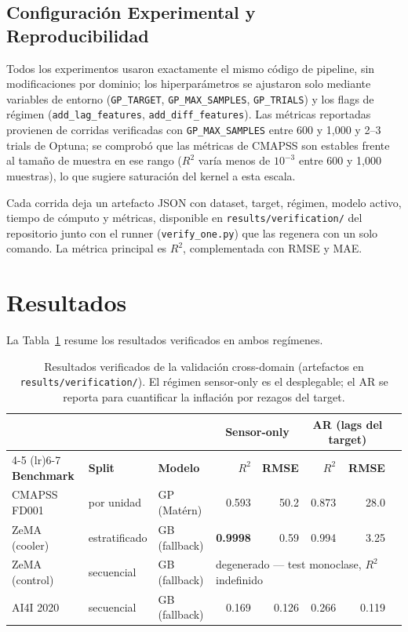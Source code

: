 \documentclass[10pt]{article}
\begin{document}
\subsection{Configuración Experimental y Reproducibilidad}

Todos los experimentos usaron exactamente el mismo código de pipeline, sin modificaciones por dominio; los hiperparámetros se ajustaron solo mediante variables de entorno (\texttt{GP\_TARGET}, \texttt{GP\_MAX\_SAMPLES}, \texttt{GP\_TRIALS}) y los flags de régimen (\texttt{add\_lag\_features}, \texttt{add\_diff\_features}). Las métricas reportadas provienen de corridas verificadas con \texttt{GP\_MAX\_SAMPLES} entre 600 y 1,000 y 2--3 trials de Optuna; se comprobó que las métricas de CMAPSS son estables frente al tamaño de muestra en ese rango ($R^2$ varía menos de $10^{-3}$ entre 600 y 1,000 muestras), lo que sugiere saturación del kernel a esta escala.

Cada corrida deja un artefacto JSON con dataset, target, régimen, modelo activo, tiempo de cómputo y métricas, disponible en \texttt{results/verification/} del repositorio junto con el runner (\texttt{verify\_one.py}) que las regenera con un solo comando. La métrica principal es $R^2$, complementada con RMSE y MAE.

\section{Resultados}

La Tabla~\ref{tab:results} resume los resultados verificados en ambos regímenes.

\begin{table}[H]
\centering
\caption{Resultados verificados de la validación cross-domain (artefactos en \texttt{results/verification/}). El régimen sensor-only es el desplegable; el AR se reporta para cuantificar la inflación por rezagos del target.}
\label{tab:results}
\begin{tabular}{lllrrrrr}
\toprule
& & & \multicolumn{2}{c}{\textbf{Sensor-only}} & \multicolumn{2}{c}{\textbf{AR (lags del target)}} \\
\cmidrule(lr){4-5} \cmidrule(lr){6-7}
\textbf{Benchmark} & \textbf{Split} & \textbf{Modelo} & $R^2$ & \textbf{RMSE} & $R^2$ & \textbf{RMSE} \\
\midrule
CMAPSS FD001 & por unidad & GP (Matérn) & 0.593 & 50.2 & 0.873 & 28.0 \\
ZeMA (cooler) & estratificado & GB (fallback) & \textbf{0.9998} & 0.59 & 0.994 & 3.25 \\
ZeMA (control) & secuencial & GB (fallback) & \multicolumn{4}{l}{degenerado --- test monoclase, $R^2$ indefinido} \\
AI4I 2020 & secuencial & GB (fallback) & 0.169 & 0.126 & 0.266 & 0.119 \\
\bottomrule
\end{tabular}
\end{table}
\end{document}
